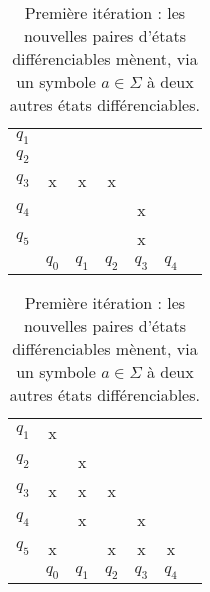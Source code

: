\begin{example}
\begin{table}[H]
\begin{subtable}{.5\textwidth}
\centering
 \begin{tabular}{ccccccc}
	 \cline{2-2}
	 \multicolumn{1}{c|}{$q_1$} & \multicolumn{1}{c|}{} &&&&\\
	 \cline{2-3}
	 \multicolumn{1}{c|}{$q_2$} & \multicolumn{1}{c|}{} &\multicolumn{1}{c|}{}&&&\\
	 \cline{2-4}
	 \multicolumn{1}{c|}{$q_3$} & \multicolumn{1}{c|}{x} &\multicolumn{1}{c|}{x}&\multicolumn{1}{c|}{x}&&\\
	 \cline{2-5}
	 \multicolumn{1}{c|}{$q_4$} & \multicolumn{1}{c|}{} &\multicolumn{1}{c|}{}&\multicolumn{1}{c|}{}&\multicolumn{1}{c|}{x}&\\
	 \cline{2-6}
	 \multicolumn{1}{c|}{$q_5$} & \multicolumn{1}{c|}{} & \multicolumn{1}{c|}{}&\multicolumn{1}{c|}{}&\multicolumn{1}{c|}{x}&\multicolumn{1}{c|}{}\\
	 \cline{2-6}
	 \multicolumn{1}{c}{} & $q_0$&$q_1$&$q_2$&$q_3$&$q_4$\\
\end{tabular}
\caption{Cas de base : tous les états sont différents de $q_3$}
\end{subtable}
\begin{subtable}{.5\textwidth}
\centering
 \begin{tabular}{ccccccc}
	 \cline{2-2}
	 \multicolumn{1}{c|}{$q_1$} & \multicolumn{1}{c|}{x} &&&&\\
	 \cline{2-3}
	 \multicolumn{1}{c|}{$q_2$} & \multicolumn{1}{c|}{} &\multicolumn{1}{c|}{x}&&&\\
	 \cline{2-4}
	 \multicolumn{1}{c|}{$q_3$} & \multicolumn{1}{c|}{x} &\multicolumn{1}{c|}{x}&\multicolumn{1}{c|}{x}&&\\
	 \cline{2-5}
	 \multicolumn{1}{c|}{$q_4$} & \multicolumn{1}{c|}{} &\multicolumn{1}{c|}{x}&\multicolumn{1}{c|}{}&\multicolumn{1}{c|}{x}&\\
	 \cline{2-6}
	 \multicolumn{1}{c|}{$q_5$} & \multicolumn{1}{c|}{x} & \multicolumn{1}{c|}{}&\multicolumn{1}{c|}{x}&\multicolumn{1}{c|}{x}&\multicolumn{1}{c|}{x}\\
	 \cline{2-6}
	 \multicolumn{1}{c}{} & $q_0$&$q_1$&$q_2$&$q_3$&$q_4$\\
 \end{tabular}
 \caption{Première itération : les nouvelles paires d'états différenciables mènent, via un symbole $a \in \Sigma$ à deux autres états différenciables.}
 \end{subtable}


\end{table}
\end{example}
